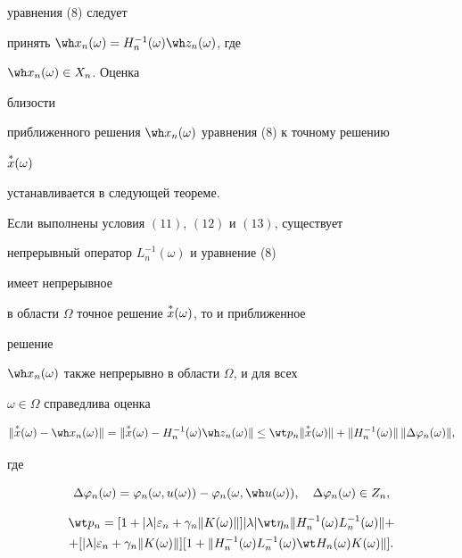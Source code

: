 уравнения (8) следует


принять $\wh x_n(\omega)=H^{-1}_n(\omega)\wh z_n(\omega)$, где


$\wh x_n(\omega)\in X_n$. Оценка


близости


приближенного решения $\wh x_n(\omega)$ уравнения (8) к точному решению


$\overset{*}{x}{}(\omega)$


устанавливается в следующей теореме.





\begin{thm} Если выполнены условия $(11)$, $(12)$ и $(13)$, существует


непрерывный оператор $L^{-1}_n(\omega)$ и уравнение (8)


имеет непрерывное


в области $\Omega$ точное решение $\overset{*}{x}{}(\omega)$, то и приближенное


решение


$\wh x_n(\omega)$ также непрерывно в области $\Omega$, и для всех


$\omega\in\Omega$ справедлива оценка


\begin{equation}


\|\up{*}{x}(\omega)-\wh x_n(\omega)\|=


\|\up{*}{x}(\omega)-H^{-1}_n(\omega)\wh z_n(\omega)\|\le


\wt p_n\|\up{*}{x}(\omega)\|+\|H^{-1}_n(\omega)\|\,


\|\Delta\varphi_n(\omega)\|,


\end{equation}


где


\begin{equation}


\Delta\varphi_n(\omega)=\varphi_n(\omega,u(\omega))-


\varphi_n(\omega,\wh u(\omega)),\quad


\Delta\varphi_n(\omega)\in Z_n,


\end{equation}


\begin{multline}


\wt p_n=[1+|\lambda|\varepsilon_n+\gamma_n\|K(\omega)\|]|\lambda|


\wt\eta_n\|H^{-1}_n(\omega)L^{-1}_n(\omega)\|+ \\


%


+[|\lambda|\varepsilon_n+\gamma_n\|K(\omega)\|][1+


\|H^{-1}_n(\omega)L^{-1}_n(\omega)\wt H_n(\omega)K(\omega)\|].


\end{multline}


\end{thm}





